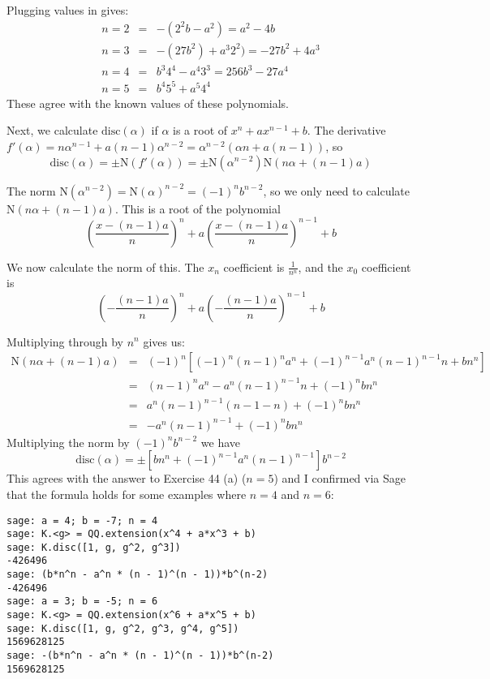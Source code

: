 \documentclass{article}
\newcommand{\norm}[0]{\text{N}}
\newcommand{\disc}[1]{\text{disc}(#1)}
\begin{document}
\begin{enumerate}
Plugging values in gives:
\begin{eqnarray*}
    n = 2 &=& -(2^2 b -  a^2) = a^2 - 4b \\
    n = 3 &=& -(27b^2) + a^3 2^2) = -27b^2 + 4a^3 \\
    n = 4 &=& b^3 4^4 - a^4 3^3 = 256b^3 - 27a^4 \\
    n = 5 &=& b^4 5^5 + a^5 4^4
\end{eqnarray*}
These agree with the known values of these polynomials.

Next, we calculate $\disc{\alpha}$ if $\alpha$ is a root of $x^n + ax^{n-1} + b$.  The derivative $f'(\alpha) = n\alpha^{n-1} + a(n-1)\alpha^{n-2} = \alpha^{n-2}(\alpha n + a(n-1))$, so \[ \disc{\alpha} = \pm \norm(f'(\alpha)) = \pm \norm(\alpha^{n-2})\norm(n\alpha + (n-1)a) \]

The norm $\norm(\alpha^{n-2}) = \norm(\alpha)^{n-2} = (-1)^{n} b^{n-2}$, so we only need to calculate $\norm(n\alpha + (n-1)a)$.  This is a root of the polynomial \[ \left(\frac{x - (n-1)a}{n}\right)^n + a\left(\frac{x - (n-1)a}{n}\right)^{n-1} + b \]

We now calculate the norm of this.  The $x_n$ coefficient is $\frac{1}{n^n}$, and the $x_0$ coefficient is \[ \left(-\frac{(n-1)a}{n}\right)^n + a\left(-\frac{(n-1)a}{n}\right)^{n-1} + b \]

Multiplying through by $n^n$ gives us:
\begin{eqnarray*}
    \norm(n\alpha + (n-1)a) &=& (-1)^n[(-1)^n (n-1)^n a^n + (-1)^{n-1} a^n (n-1)^{n-1} n + b n^n] \\
    &=& (n-1)^n a^n - a^n (n-1)^{n-1} n + (-1)^n b n^n \\
    &=& a^n (n - 1)^{n-1}(n-1 - n) + (-1)^n bn^n \\
    &=& -a^n (n - 1)^{n-1} + (-1)^n bn^n
\end{eqnarray*}
Multiplying the norm by $(-1)^n b^{n-2}$ we have
\[ \disc{\alpha} = \pm [ bn^n + (-1)^{n-1} a^n (n - 1)^{n-1}] b^{n-2} \]
This agrees with the answer to Exercise 44 (a) ($n = 5$) and I confirmed via Sage that the formula holds for some examples where $n = 4$ and $n = 6$:
\begin{verbatim}
sage: a = 4; b = -7; n = 4
sage: K.<g> = QQ.extension(x^4 + a*x^3 + b)
sage: K.disc([1, g, g^2, g^3])
-426496
sage: (b*n^n - a^n * (n - 1)^(n - 1))*b^(n-2)
-426496
sage: a = 3; b = -5; n = 6
sage: K.<g> = QQ.extension(x^6 + a*x^5 + b)
sage: K.disc([1, g, g^2, g^3, g^4, g^5])
1569628125
sage: -(b*n^n - a^n * (n - 1)^(n - 1))*b^(n-2)
1569628125
\end{verbatim}

\end{enumerate}
\end{document}
